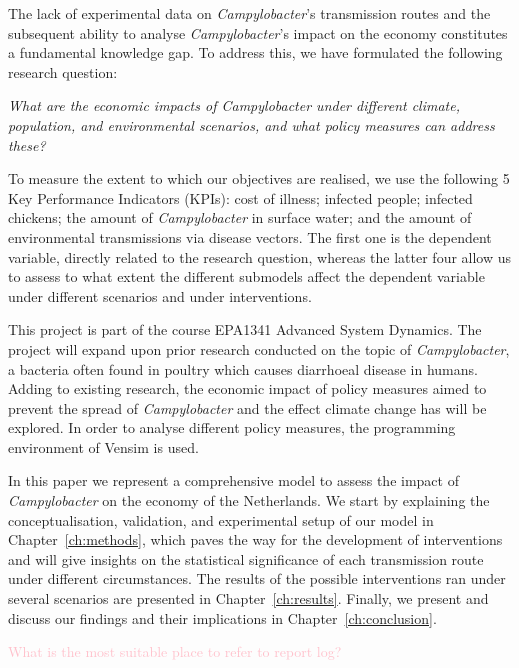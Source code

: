 The lack of experimental data on \textit{Campylobacter}’s transmission routes and the subsequent ability to analyse \textit{Campylobacter}’s impact on the economy constitutes a fundamental knowledge gap. To address this, we have formulated the following research question:
\begin{center}\textit{\textcolor{NiceBlue}{
What are the economic impacts of Campylobacter under different climate, population, and environmental scenarios, and what policy measures can address these? 
}}
\end{center}
To measure the extent to which our objectives are realised, we use the following 5 Key Performance Indicators (KPIs): cost of illness; infected people; infected chickens; the amount of \textit{Campylobacter} in surface water; and the amount of environmental transmissions via disease vectors. The first one is the dependent variable, directly related to the research question, whereas the latter four allow us to assess to what extent the different submodels affect the dependent variable under different scenarios and under interventions.

This project is part of the course EPA1341 Advanced System Dynamics. The project will expand upon prior research conducted on the topic of \textit{Campylobacter}, a bacteria often found in poultry which causes diarrhoeal disease in humans. Adding to existing research, the economic impact of policy measures aimed to prevent the spread of  \textit{Campylobacter} and the effect climate change has will be explored. In order to analyse different policy measures, the programming environment of Vensim is used. 

In this paper we represent a comprehensive model to assess the impact of \textit{Campylobacter} on the economy of the Netherlands. We start by explaining the conceptualisation, validation, and experimental setup of our model in Chapter~\ref{ch:methods}, which paves the way for the development of interventions and will give insights on the statistical significance of each transmission route under different circumstances. The results of the possible interventions ran under several scenarios are presented in Chapter~\ref{ch:results}. Finally, we present and discuss our findings and their implications in Chapter~\ref{ch:conclusion}.


{\Huge \textcolor{pink}{What is the most suitable place to refer to report log?}}